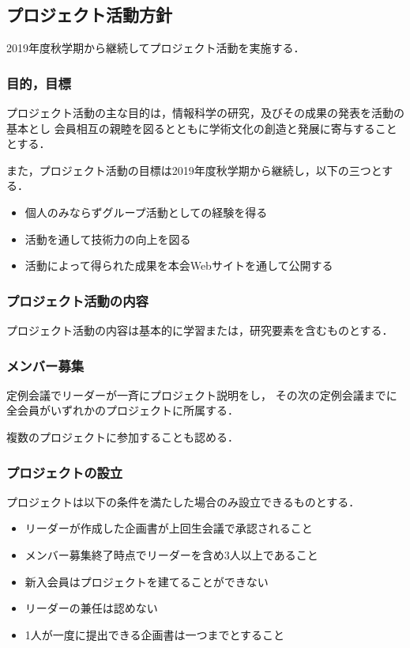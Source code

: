 \subsection*{プロジェクト活動方針}

2019年度秋学期から継続してプロジェクト活動を実施する．

\subsubsection*{目的，目標}
プロジェクト活動の主な目的は，情報科学の研究，及びその成果の発表を活動の基本とし
会員相互の親睦を図るとともに学術文化の創造と発展に寄与することとする．

また，プロジェクト活動の目標は2019年度秋学期から継続し，以下の三つとする．

\begin{itemize}
\item 個人のみならずグループ活動としての経験を得る
\item 活動を通して技術力の向上を図る
\item 活動によって得られた成果を本会Webサイトを通して公開する
\end{itemize}


\subsubsection*{プロジェクト活動の内容}
プロジェクト活動の内容は基本的に学習または，研究要素を含むものとする．

\subsubsection*{メンバー募集}
定例会議でリーダーが一斉にプロジェクト説明をし，
その次の定例会議までに全会員がいずれかのプロジェクトに所属する．

複数のプロジェクトに参加することも認める．

\subsubsection*{プロジェクトの設立}
プロジェクトは以下の条件を満たした場合のみ設立できるものとする．

\begin{itemize}
\item リーダーが作成した企画書が上回生会議で承認されること
\item メンバー募集終了時点でリーダーを含め3人以上であること
\item 新入会員はプロジェクトを建てることができない
\item リーダーの兼任は認めない
\item 1人が一度に提出できる企画書は一つまでとすること
\end{itemize}

